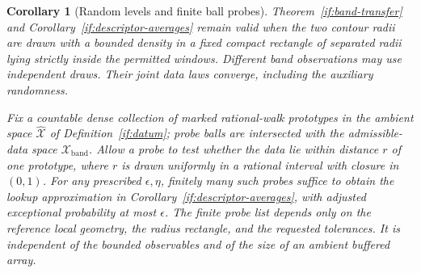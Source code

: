 \documentclass[11pt]{article}
\newtheorem{corollary}[theorem]{Corollary}
\theoremstyle{definition}
\theoremstyle{remark}
\numberwithin{equation}{section}
\begin{document}
\begin{corollary}[Random levels and finite ball probes]
\label{if:random-levels}
Theorem~\ref{if:band-transfer} and
Corollary~\ref{if:descriptor-averages} remain valid when the two contour radii are
drawn with a bounded density in a fixed compact rectangle of separated
radii lying strictly inside the permitted windows.  Different band
observations may use independent draws.  Their joint data laws
converge, including the auxiliary randomness.

Fix a countable dense collection of marked rational-walk prototypes
in the ambient space $\widehat{\mathcal X}$ of
Definition~\ref{if:datum}; probe balls are intersected with the
admissible-data space $\mathcal X_{\mathrm{band}}$. Allow a probe to test
whether the data lie within distance $r$ of one prototype, where
$r$ is drawn uniformly in a rational interval with closure in $(0,1)$.
For any prescribed $\epsilon,\eta$, finitely many such probes suffice
to obtain the lookup approximation in
Corollary~\ref{if:descriptor-averages}, with adjusted exceptional
probability at most $\epsilon$.  The finite probe list depends only
on the reference local geometry, the radius rectangle, and the
requested tolerances.  It is independent of the bounded observables
and of the size of an ambient buffered array.
\end{corollary}
\end{document}
